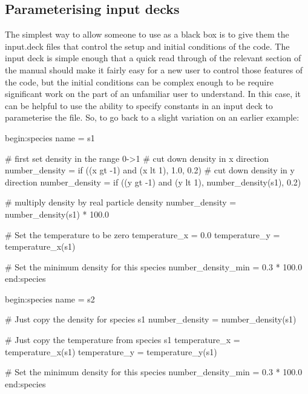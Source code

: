 \subsection{Parameterising input decks}
\label{sec:customising}
The simplest way to allow someone to use {\EPOCH} as a black box is to give them
the input.deck files that control the setup and initial conditions
of the code. The input deck is simple enough that a quick read through of the
relevant section of the manual should make it fairly easy for a new user to
control those features of the code, but the initial conditions can be complex
enough to be require significant work on the part of an unfamiliar user to
understand. In this case, it can be helpful to use the ability to specify
constants in an input deck to parameterise the file. So, to go back to a slight
variation on an earlier example:
\begin{boxverbatim}
begin:species
   name = s1

   # first set density in the range 0->1
   # cut down density in x direction
   number_density = if ((x gt -1) and (x lt 1), 1.0, 0.2)
   # cut down density in y direction
   number_density = if ((y gt -1) and (y lt 1), number_density(s1), 0.2)

   # multiply density by real particle density
   number_density = number_density(s1) * 100.0

   # Set the temperature to be zero
   temperature_x = 0.0
   temperature_y = temperature_x(s1)

   # Set the minimum density for this species
   number_density_min = 0.3 * 100.0
end:species

begin:species
   name = s2

   # Just copy the density for species s1
   number_density = number_density(s1)

   # Just copy the temperature from species s1
   temperature_x = temperature_x(s1)
   temperature_y = temperature_y(s1)

   # Set the minimum density for this species
   number_density_min = 0.3 * 100.0
end:species
\end{boxverbatim}

